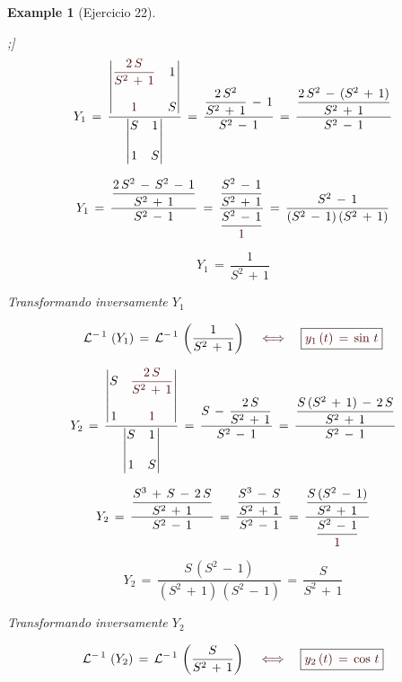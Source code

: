 \documentclass[a4paper,11pt,openany]{book}
\newtheorem{exmp}{Example}[section]
\newcommand*{\itembolasazules}[1]{%
\footnotesize\protect\tikz[baseline=-3pt]%
\protect\node[scale=.7, circle, shade, ball
color=green]{\color{white}\Large\bf#1};}
\begin{document}
\begin{exmp}[Ejercicio 22]
\begin{enumerate}[label=\itembolasazules{\arabic*}]
$$Y_{1}\,=\,\dfrac{\begin{vmatrix}
\textcolor{bulgarianrose}{\dfrac{2\,S}{S^{2}\,+\,1}} & 1 \\
\\
\textcolor{bulgarianrose}{1} & S
\end{vmatrix} }{\begin{vmatrix}
S & 1 \\
\\
1 & S
\end{vmatrix} }\,=\,\dfrac{\dfrac{2\,S^{2}}{S^{2}\,+\,1}\,-\,1 }{S^{2}\,-\,1 }\,=\,\dfrac{\dfrac{2\,S^{2}\,-\,(S^{2}\,+\,1) }{S^{2}\,+\,1 } }{S^{2}\,-\,1  } $$
 
$$Y_{1}\,=\,\dfrac{\dfrac{2\,S^{2}\,-\,S^{2}\,-\,1 }{S^{2}\,+\,1 } }{S^{2}\,-\,1  }\,=\,\dfrac{\dfrac{S^{2}\,-\,1 }{S^{2}\,+\,1 } }{\dfrac{S^{2}\,-\,1}{\textcolor{bulgarianrose}{1}  }  }\,=\,\dfrac{S^{2}\,-\,1 }{(S^{2}\,-\,1)\,(S^{2}\,+\,1) } $$
 
$$Y_{1}\,=\,\dfrac{1}{S^{2}\,+\,1}$$
 
Transformando inversamente $Y_{1}$
 
$$\mathcal{L}^{-\,1}\,\left(Y_{1} \right)\,=\,\mathcal{L}^{-\,1}\,\left(\dfrac{1}{S^{2}\,+\,1} \right) \quad \textcolor{bulgarianrose}{\iff} \quad \boxed{\textcolor{bulgarianrose}{y_{1}\,(t)\,=\,\sin\,t}} $$
 
$$Y_{2}\,=\,\dfrac{\begin{vmatrix}
S & \textcolor{bulgarianrose}{\dfrac{2\,S}{S^{2}\,+\,1}} \\
\\
1 & \textcolor{bulgarianrose}{1}
\end{vmatrix} }{\begin{vmatrix}
S & 1 \\
\\
1 & S
\end{vmatrix} }\,=\,\dfrac{S\,-\,\dfrac{2\,S}{S^{2}\,+\,1} }{S^{2}\,-\,1}\,=\,\dfrac{\dfrac{S\,(S^{2}\,+\,1)\,-\,2\,S }{S^{2}\,+\,1 }}{S^{2}\,-\,1 }$$
 
$$Y_{2}\,=\,\dfrac{\dfrac{S^{3}\,+\,S\,-\,2\,S }{S^{2}\,+\,1 }}{S^{2}\,-\,1 }\,=\,\dfrac{\dfrac{S^{3}\,-\,S }{S^{2}\,+\,1 }}{S^{2}\,-\,1 }\,=\,\dfrac{\dfrac{S\,(S^{2}\,-\,1) }{S^{2}\,+\,1 }}{\dfrac{S^{2}\,-\,1}{\textcolor{bulgarianrose}{1}} }$$
 
$$Y_{2}\,=\,\dfrac{S\,(S^{2}\,-\,1) }{(S^{2}\,+\,1)\,(S^{2}\,-\,1) }\,=\,\dfrac{S}{S^{2}\,+\,1}$$
 
Transformando inversamente $Y_{2}$
 
$$\mathcal{L}^{-\,1}\,\left(Y_{2} \right)\,=\,\mathcal{L}^{-\,1}\,\left(\dfrac{S}{S^{2}\,+\,1} \right) \quad \textcolor{bulgarianrose}{\iff} \quad \boxed{\textcolor{bulgarianrose}{y_{2}\,(t)\,=\,\cos\,t}} $$
 
\end{enumerate}

\end{exmp}
 
\end{document}

